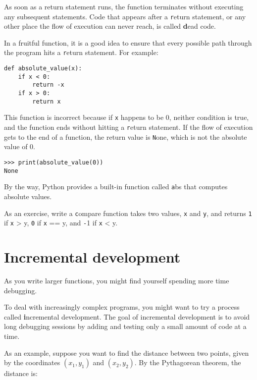 \documentclass[
DIV=11,
fontsize=13,
twoside,
headinclude=false,
titlepage=firstiscover,
abstract=true,
headsepline=true,
footsepline=true,
chapterprefix=true, %
headings=big,
bibliography=totoc,%
captions=tableheading
]{scrbook}
\theoremstyle{definition}
\begin{document}
As soon as a return statement runs, the function
terminates without executing any subsequent statements.
Code that appears after a {\texttt return} statement, or any other place
the flow of execution can never reach, is called {\textbf dead code}.

In a fruitful function, it is a good idea to ensure
that every possible path through the program hits a
{\texttt return} statement.  For example:

\begin{lstlisting}
def absolute_value(x):
    if x < 0:
        return -x
    if x > 0:
        return x
\end{lstlisting}
%
This function is incorrect because if {\texttt x} happens to be 0,
neither condition is true, and the function ends without hitting a
{\texttt return} statement.  If the flow of execution gets to the end
of a function, the return value is {\texttt None}, which is not
the absolute value of 0.

\begin{lstlisting}
>>> print(absolute_value(0))
None
\end{lstlisting}
%
By the way, Python provides a built-in function called 
{\texttt abs} that computes absolute values.

As an exercise, write a {\texttt compare} function
takes two values, {\texttt x} and {\texttt y}, and returns {\texttt 1} if {\texttt x > y},
{\texttt 0} if {\texttt x == y}, and {\texttt -1} if {\texttt x < y}.


\section{Incremental development}
\label{incremental.development}

As you write larger functions, you might find yourself
spending more time debugging.

To deal with increasingly complex programs,
you might want to try a process called
{\textbf incremental development}.  The goal of incremental development
is to avoid long debugging sessions by adding and testing only
a small amount of code at a time.

As an example, suppose you want to find the distance between two
points, given by the coordinates $(x_1, y_1)$ and $(x_2, y_2)$.
By the Pythagorean theorem, the distance is:
\end{document}
